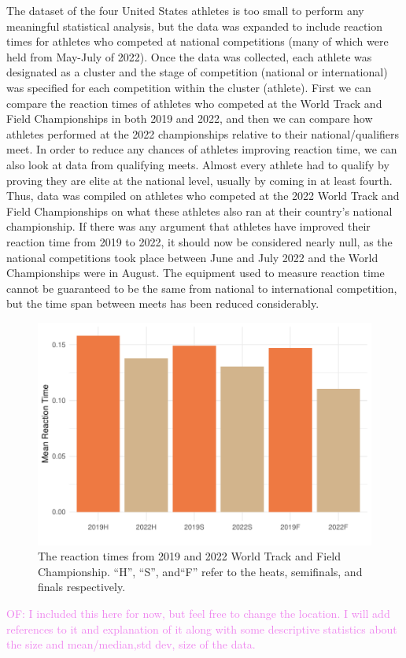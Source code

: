 \documentclass[12pt, letterpaper, titlepage]{article}
\newcommand{\of}[1]{\textcolor{violet}{OF: #1}}
\begin{document}
The dataset of the four United States athletes 
is too small to perform any meaningful statistical analysis, but
the data was expanded to include reaction times for athletes who competed at 
national competitions (many of which were held from May-July of 2022). Once the 
data was collected, each athlete was designated as a cluster and the stage of
competition (national or international) was specified for each competition 
within the cluster (athlete). First we can compare the reaction times of athletes who
competed at the World Track and Field Championships in both 2019 and 2022, and 
then we can compare how athletes performed at the 2022 championships relative 
to their national/qualifiers meet. In order to reduce any chances
of athletes improving reaction time, we can also look at data from qualifying meets.
Almost every athlete had to qualify by proving they are elite at the national level, 
usually by coming in at least fourth. Thus, data was compiled on athletes who competed
at the 2022 World Track and Field Championships on what these athletes also ran 
at their country's national championship. If there was any argument that athletes
have improved their reaction time from 2019 to 2022, it should now be considered
nearly null, as the national competitions took place between June and July 2022 
and the World Championships were in August. The equipment used to measure reaction
time cannot be guaranteed to be the same from national to international
competition, but the time span between meets has been reduced considerably. 

\begin{figure}[tbp]
  \centering
  \includegraphics{2019vs2022BarGraph}
  \caption{The reaction times from 2019 and 2022 World Track and Field
  Championship. ``H'', ``S'', and``F'' refer to the heats, semifinals, and finals
  respectively.}
  \label{fig:2019vs2022Graph}
\end{figure}
\of{I included this here for now, but feel free to change the location.  I will
add references to it and explanation of it along with some descriptive statistics about
the size and mean/median,std dev, size of the data.}
\end{document}

